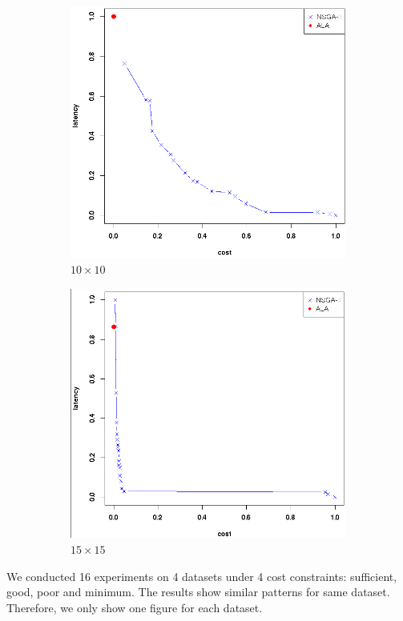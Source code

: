 \documentclass{llncs}
\begin{document}
\begin{figure}[H]
	\begin{subfigure}[b]{0.49\textwidth}
		\includegraphics[width=\textwidth]{pics/111.png}
		\caption{$10 \times 10$}
		\label{fig:10_10}
	\end{subfigure}
	\begin{subfigure}[b]{0.49\textwidth}
		\includegraphics[width=\textwidth]{pics/112.png}
		\caption{$15 \times 15$}
		\label{fig:15_15}
	\end{subfigure}

	\caption{}\label{fig:condition}
\end{figure}
We conducted 16 experiments on 4 datasets under 4 cost constraints: sufficient, good, poor and minimum. The results show similar 
patterns for same dataset. Therefore, we only show one figure for each dataset.
\end{document}
